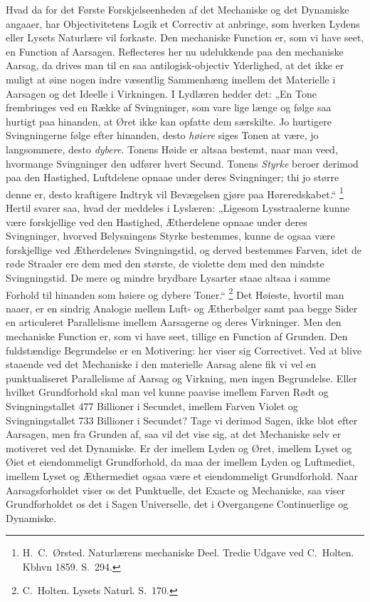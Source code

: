 \documentclass[12pt]{book}
\newcommand{\opage}[1]{\marginnote{\footnotesize\textit{[#1]}}}
\begin{document}
Hvad da for det Første Forskjelseenheden af det Mechaniske og det Dynamiske angaaer, har
Objectivitetens Logik et Correctiv at anbringe, som hverken Lydens eller Lysets Naturlære vil
forkaste. Den mechaniske Function er, som vi have seet, en Function af Aarsagen. Reflecteres
her nu udelukkende paa den mechaniske Aarsag, da drives man til en saa antilogisk-objectiv
Yderlighed, at det ikke er muligt at øine nogen indre væsentlig Sammenhæng imellem det
Materielle i Aarsagen og det Ideelle i Virkningen. I Lydlæren hedder det: „En Tone frembringes
ved en Række af Svingninger, som vare lige længe og følge saa hurtigt paa hinanden, at Øret
ikke kan opfatte dem særskilte. Jo hurtigere Svingningerne følge efter hinanden, desto
\emph{høiere} siges Tonen at være, jo langsommere, desto \emph{dybere}. Tonens Høide er altsaa
bestemt, naar man veed, hvormange Svingninger den udfører hvert Secund. Tonens \emph{Styrke}
beroer derimod paa den Hastighed, Luftdelene opnaae under deres Svingninger; thi jo større
denne er, desto kraftigere Indtryk vil Bevægelsen gjøre paa Høreredskabet.“%
\footnote{H.\ C.\ Ørsted. Naturlærens mechaniske Deel. Tredie Udgave ved C.\ Holten. Kbhvn
  1859. S.~294.}
Hertil svarer saa, hvad der meddeles i Lyslæren: „Ligesom Lysstraalerne kunne være
forskjellige ved den Hastighed, Ætherdelene opnaae under deres Svingninger, hvorved Belysningens
Styrke bestemmes, kunne de ogsaa være forskjellige ved Ætherdelenes
\opage{385} Svingningstid, og derved bestemmes Farven, idet de røde Straaler ere dem med den største, de
violette dem med den mindste Svingningstid. De mere og mindre brydbare Lysarter staae altsaa i
samme Forhold til hinanden som høiere og dybere Toner.“%
\footnote{C.\ Holten. Lysets Naturl. S.~170.}
Det Høieste, hvortil man naaer, er en sindrig Analogie mellem Luft- og Ætherbølger samt paa
begge Sider en articuleret Parallelisme imellem Aarsagerne og deres Virkninger. Men den
mechaniske Function er, som vi have seet, tillige en Function af Grunden. Den fuldstændige
Begrundelse er en Motivering: her viser sig Correctivet. Ved at blive staaende ved det
Mechaniske i den materielle Aarsag alene fik vi vel en punktualiseret Parallelisme af Aarsag
og Virkning, men ingen Begrundelse. Eller hvilket Grundforhold skal man vel kunne paavise
imellem Farven Rødt og Svingningstallet 477 Billioner i Secundet, imellem Farven Violet og
Svingningstallet 733 Billioner i Secundet? Tage vi derimod Sagen, ikke blot efter Aarsagen,
men fra Grunden af, saa vil det vise sig, at det Mechaniske selv er motiveret ved det
Dynamiske. Er der imellem Lyden og Øret, imellem Lyset og Øiet et eiendommeligt Grundforhold,
da maa der imellem Lyden og Luftmediet, imellem Lyset og Æthermediet ogsaa være et
eiendommeligt Grundforhold. Naar Aarsagsforholdet viser os det Punktuelle, det Exacte og
Mechaniske, saa viser Grundforholdet os det i Sagen Universelle, det i Overgangene
Continuerlige og Dynamiske.
\end{document}
